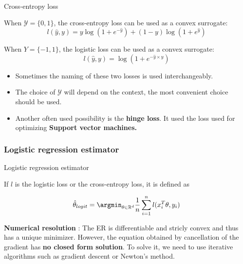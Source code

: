 \documentclass[
10pt, %
a4paper, %
oneside, %
headinclude,footinclude, %
BCOR5mm, %
]{scrartcl}
\begin{document}
\begin{definition}{Cross-entropy loss}

    When $ \mathcal{Y}  = \{0, 1\}$, the cross-entropy loss can be used as a convex surrogate:
    \label{loss:cross}
	\begin{equation}
	    l(\hat{y}, y) = y\log(1+e^{- \hat{y}})+ (1-y)\log(1+e^{ \hat{y}})
	\end{equation}
\end{definition}

\begin{definition}

    When $Y= \{-1, 1\}$, the logistic loss can be used as a convex surrogate: 
	\begin{equation}
	    \label{loss:logistic}
	    l(\hat{y}, y) = \log(1+e^{- \hat{y}\times y})
	\end{equation}
\end{definition}

\begin{remark}
    \begin{itemize}
	\item Sometimes the naming of these two losses is used interchangeably.
        \item The choice of $ \mathcal{Y} $ will depend on the context, the most convenient choice should be used.
	\item Another often used possibility is the \textbf{{hinge loss}}. It used the loss used for optimizing \textbf{{Support vector machines.}} 
    \end{itemize}
\end{remark}


\subsubsection{\large\color{Periwinkle}Logistic regression estimator}

\begin{definition}{Logistic regression estimator}
    \label{def:logicest}

    If $l$ is the logistic loss or the cross-entropy loss, it is defined as

    \begin{equation}
	\hat{\theta}_{logit} = \argmin_{\theta\in \mathbb{R}^d} \frac{1}{n} \sum^{n}_{i=1} l(x_i^T\theta, y_i) 
    \end{equation}
\end{definition}

\textbf{{Numerical resolution}} : The ER is differentiable and stricly convex and thus has a unique minimizer. However, the equation obtained by cancellation of the gradient has \textbf{{no closed form solution}}. To solve it, we need to use iterative algorithms such as gradient descent or Newton's method.
\end{document}
